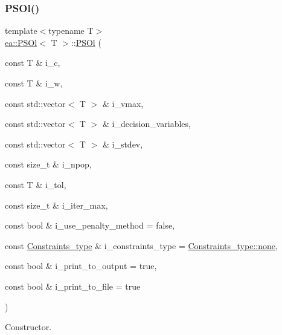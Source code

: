 \subsubsection{\texorpdfstring{P\+S\+Ol()}{PSOl()}}
{\footnotesize\ttfamily template$<$typename T$>$ \\
\hyperlink{structea_1_1_p_s_ol}{ea\+::\+P\+S\+Ol}$<$ T $>$\+::\hyperlink{structea_1_1_p_s_ol}{P\+S\+Ol} (\begin{DoxyParamCaption}\item[{const T \&}]{i\+\_\+c,  }\item[{const T \&}]{i\+\_\+w,  }\item[{const std\+::vector$<$ T $>$ \&}]{i\+\_\+vmax,  }\item[{const std\+::vector$<$ T $>$ \&}]{i\+\_\+decision\+\_\+variables,  }\item[{const std\+::vector$<$ T $>$ \&}]{i\+\_\+stdev,  }\item[{const size\+\_\+t \&}]{i\+\_\+npop,  }\item[{const T \&}]{i\+\_\+tol,  }\item[{const size\+\_\+t \&}]{i\+\_\+iter\+\_\+max,  }\item[{const bool \&}]{i\+\_\+use\+\_\+penalty\+\_\+method = {\ttfamily false},  }\item[{const \hyperlink{namespaceutilities_ab1a1517bf6e62a1acfab5293ca8985c1}{Constraints\+\_\+type} \&}]{i\+\_\+constraints\+\_\+type = {\ttfamily \hyperlink{namespaceea_a8e369877773b4db67b8512efdb4f8f89a334c4a4c42fdb79d7ebc3e73b517e6f8}{Constraints\+\_\+type\+::none}},  }\item[{const bool \&}]{i\+\_\+print\+\_\+to\+\_\+output = {\ttfamily true},  }\item[{const bool \&}]{i\+\_\+print\+\_\+to\+\_\+file = {\ttfamily true} }\end{DoxyParamCaption})\hspace{0.3cm}{\ttfamily [inline]}}



Constructor. 


